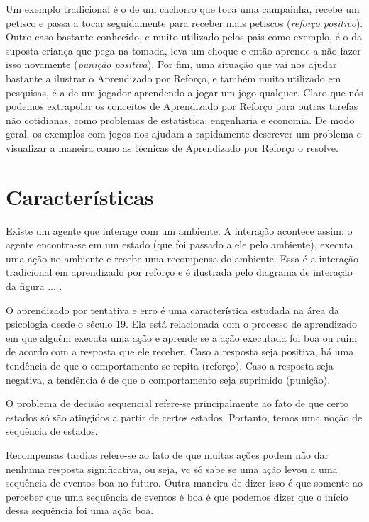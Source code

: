 \documentclass{article}
\begin{document}
        Um exemplo tradicional é o de um cachorro que toca uma campainha, recebe um petisco e passa a tocar seguidamente para receber mais petiscos (\emph{reforço positivo}). Outro caso bastante conhecido, e muito utilizado pelos pais como exemplo, é o da suposta criança que pega na tomada, leva um choque e então aprende a não fazer isso novamente (\emph{punição positiva}). Por fim, uma situação que vai nos ajudar bastante a ilustrar o Aprendizado por Reforço, e também muito utilizado em pesquisas, é a de um jogador aprendendo a jogar um jogo qualquer. Claro que nós podemos extrapolar os conceitos de Aprendizado por Reforço para outras tarefas não cotidianas, como problemas de estatística, engenharia e economia. De modo geral, os exemplos com jogos nos ajudam a rapidamente descrever um problema e visualizar a maneira como as técnicas de Aprendizado por Reforço o resolve.
            
    \section{Características}
    
        Existe um agente que interage com um ambiente. A interação acontece assim: o agente encontra-se em um estado (que foi passado a ele pelo ambiente), executa uma ação no ambiente e recebe uma recompensa do ambiente. Essa é a interação tradicional em aprendizado por reforço e é ilustrada pelo diagrama de interação da figura ... .
        
        O aprendizado por tentativa e erro é uma característica estudada na área da psicologia desde o século 19. Ela está relacionada com o processo de aprendizado em que alguém executa uma ação e aprende se a ação executada foi boa ou ruim de acordo com a resposta que ele receber. Caso a resposta seja positiva, há uma tendência de que o comportamento se repita (reforço). Caso a resposta seja negativa, a tendência é de que o comportamento seja suprimido (punição).
        
        O problema de decisão sequencial refere-se principalmente ao fato de que certo estados só são atingidos a partir de certos estados. Portanto, temos uma noção de sequência de estados.
        
        Recompensas tardias refere-se ao fato de que muitas ações podem não dar nenhuma resposta significativa, ou seja, vc só sabe se uma ação levou a uma sequência de eventos boa no futuro. Outra maneira de dizer isso é que somente ao perceber que uma sequência de eventos é boa é que podemos dizer que o início dessa sequência foi uma ação boa.
    
\end{document}
